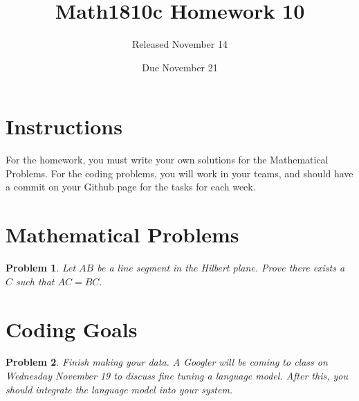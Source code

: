 \documentclass{article}
\title{Math1810c Homework 10}
\author{Released November 14}
\date{Due November 21}
\newtheorem{problem}{Problem}
\begin{document}
\maketitle

\section{Instructions}

For the homework, you must write your own solutions for the Mathematical Problems. For the coding problems, you will work in your teams, and should have a commit on your Github page for the tasks for each week. 

\section{Mathematical Problems}

\begin{problem}
    Let $AB$ be a line segment in the Hilbert plane. Prove there exists a $C$ such that $AC = BC$.
\end{problem}


\newpage

\section{Coding Goals}

\begin{problem}
    Finish making your data. A Googler will be coming to class on Wednesday November 19 to discuss fine tuning a language model. After this, you should integrate the language model into your system. 
\end{problem}
\end{document}
